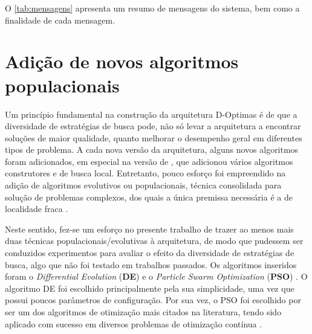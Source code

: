 \begin{quadro}[ht!]

\end{quadro}

O \autoref{tab:mensagens} apresenta um resumo de mensagens do sistema, bem como a finalidade de cada mensagem. 

\section{Adição de novos algoritmos populacionais}
\label{sec:algoritmos}

Um princípio fundamental na construção da arquitetura D-Optimas é de que a diversidade de estratégias de busca pode, não só levar a arquitetura a encontrar soluções de maior qualidade, quanto melhorar o desempenho geral em diferentes tipos de problema. A cada nova versão da arquitetura, alguns novos algoritmos foram adicionados, em especial na versão de , que adicionou vários algoritmos construtores e de busca local. Entretanto, pouco esforço foi empreendido na adição de algoritmos evolutivos ou populacionais, técnica consolidada para solução de problemas complexos, dos quais a única premissa necessária é a de localidade fraca \cite{gaspar2012}.

Neste sentido, fez-se um esforço no presente trabalho de trazer ao menos mais duas técnicas populacionais/evolutivas à arquitetura, de modo que pudessem ser conduzidos experimentos para avaliar o efeito da diversidade de estratégias de busca, algo que não foi testado em trabalhos passados. Os algoritmos inseridos foram o \textit{Differential Evolution} (\textbf{DE}) \cite{storn1997} e o \textit{Particle Swarm Optimization} (\textbf{PSO}) \cite{eberhart1995, eberhart1998}. O algoritmo DE foi escolhido principalmente pela sua simplicidade, uma vez que possui poucos parâmetros de configuração. Por sua vez, o PSO foi escolhido por ser um dos algoritmos de otimização mais citados na literatura, tendo sido aplicado com sucesso em diversos problemas de otimização contínua \cite{bonyadi2017}. 

